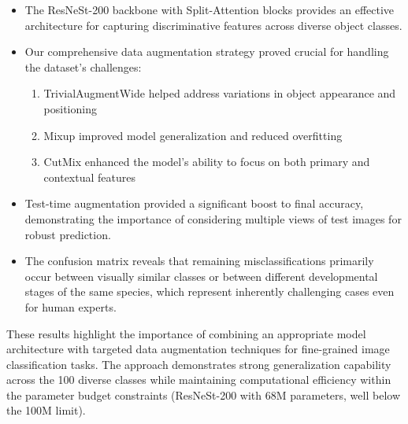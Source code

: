 \documentclass[twocolumn,a4paper]{article}
\begin{document}
\begin{itemize}
\item The ResNeSt-200 backbone with Split-Attention blocks provides an effective architecture for capturing discriminative features across diverse object classes.

\item Our comprehensive data augmentation strategy proved crucial for handling the dataset's challenges:
  \begin{enumerate}
  \item TrivialAugmentWide helped address variations in object appearance and positioning
  \item Mixup improved model generalization and reduced overfitting
  \item CutMix enhanced the model's ability to focus on both primary and contextual features
  \end{enumerate}

\item Test-time augmentation provided a significant boost to final accuracy, demonstrating the importance of considering multiple views of test images for robust prediction.

\item The confusion matrix reveals that remaining misclassifications primarily occur between visually similar classes or between different developmental stages of the same species, which represent inherently challenging cases even for human experts.
\end{itemize}

These results highlight the importance of combining an appropriate model architecture with targeted data augmentation techniques for fine-grained image classification tasks. The approach demonstrates strong generalization capability across the 100 diverse classes while maintaining computational efficiency within the parameter budget constraints (ResNeSt-200 with 68M parameters, well below the 100M limit).




\end{document}
